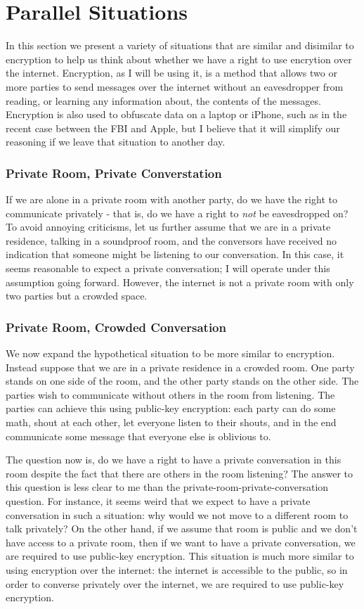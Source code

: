 \documentclass[11pt]{article}
\begin{document}
\section{Parallel Situations}
In this section we present a variety of situations that are similar and disimilar to encryption to help us think about whether we have a right to use encrytion over the internet.
Encryption, as I will be using it, is a method that allows two or more parties to send messages over the internet without an eavesdropper from reading, or learning any information about, the contents of the messages.
Encryption is also used to obfuscate data on a laptop or iPhone, such as in the recent case between the FBI and Apple, but I believe that it will simplify our reasoning if we leave that situation to another day.

\subsubsection{Private Room, Private Converstation}
If we are alone in a private room with another party, do we have the right to communicate privately - that is, do we have a right to \textit{not} be eavesdropped on?
To avoid annoying criticisms, let us further assume that we are in a private residence, talking in a soundproof room, and the conversors have received no indication that someone might be listening to our conversation.
In this case, it seems reasonable to expect a private conversation; I will operate under this assumption going forward.
However, the internet is not a private room with only two parties but a crowded space.


\subsubsection{Private Room, Crowded Conversation}

We now expand the hypothetical situation to be more similar to encryption.
Instead suppose that we are in a private residence in a crowded room. 
One party stands on one side of the room, and the other party stands on the other side.
The parties wish to communicate without others in the room from listening.
The parties can achieve this using public-key encryption: each party can do some math, shout at each other, let everyone listen to their shouts, and in the end communicate some message that everyone else is oblivious to.

The question now is, do we have a right to have a private conversation in this room despite the fact that there are others in the room listening?
The answer to this question is less clear to me than the private-room-private-conversation question.
For instance, it seems weird that we expect to have a private conversation in such a situation: why would we not move to a different room to talk privately?
On the other hand, if we assume that room is public and  we don't have access to a private room, then if we want to have a private conversation, we are required to use public-key encryption.
This situation is much more similar to using encryption over the internet: the internet is accessible to the public, so in order to converse privately over the internet, we are required to use public-key encryption.
\end{document}
